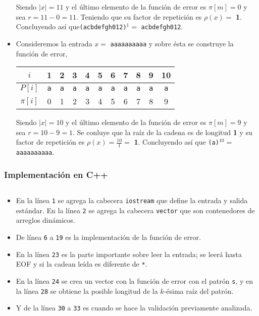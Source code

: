 \begin{itemize}
Siendo $\vert x \vert = 11$ y el último elemento de la función de error es $\pi[m] = 0$ y sea
$r = 11 - 0 = 11$. Teniendo que su factor de repetición es $\rho(x) = $ \textbf{1}. Concluyendo
así que\texttt{(acbdefgh012)}$^1 = $ \texttt{acbdefgh012}.

\item Consideremos la entrada $x =$ \texttt{aaaaaaaaaa} y sobre ésta se construye la función
de error, 
\begin{table}[h]
\centering
\begin{tabular}{c|c|c|c|c|c|c|c|c|c|c|}
\cline{2-11}
$i$      & 1          & 2          & 3          & 4          & 5          & 6          & 7          & 8          & 9          & 10         \\ \hline
$P[i]$   & \texttt{a} & \texttt{a} & \texttt{a} & \texttt{a} & \texttt{a} & \texttt{a} & \texttt{a} & \texttt{a} & \texttt{a} & \texttt{a} \\ \hline
$\pi[i]$ & 0          & 1          & 2          & 3          & 4          & 5          & 6          & 7          & 8          & 9          \\ \cline{2-11} 
\end{tabular}
\end{table}

Siendo $\vert x \vert = 10$ y el último elemento de la función de error es $\pi[m] = 9$ y sea
$r = 10 - 9 = 1$. Se conluye que la raíz de la cadena es de longitud \textbf{1} y su factor de
repetición es $\rho(x) = \frac{10}{1} =$ \textbf{1}. %
Concluyendo así que
\texttt{(a)}$^{10} = $ \texttt{aaaaaaaaaa}.
\end{itemize}
\newpage

\subsubsection{Implementación en C++}
\inputminted[linenos, frame=lines, fontsize=\footnotesize]{cpp}{problemas/cpp/FINDSR.cpp}

\begin{itemize}
\item En la línea \texttt{1} se agrega la cabecera \texttt{iostream} que define la entrada y salida
estándar. En la línea \texttt{2} se agrega la cabecera \texttt{vector} que son contenedores de
arreglos dinámicos.

\item De línea \texttt{6} a \texttt{19} es la implementación de la función de error.

\item En la línea \texttt{23} es la parte importante sobre leer la entrada; se leerá hasta EOF y si
la cadean leída es diferente de \texttt{*}.

\item En la línea \texttt{24} se crea un vector con la función de error con el patrón \texttt{s}, y
en la línea \texttt{28} se obtiene la posible longitud de la $k$-ésima raíz del patrón.

\item Y de la línea \texttt{30} a \texttt{33} es cuando se hace la validación previamente analizada.
\end{itemize}

